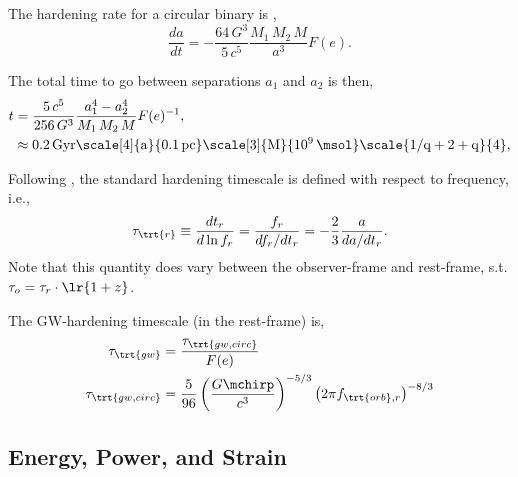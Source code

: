 \documentclass[10pt, oneside, onecolumn]{article}   	%
\newcommand{\frstorb}{f_{\trt{orb},r}}
\newcommand{\thard}{\tau_\trt{r}}
\newcommand{\tgw}{\tau_\trt{gw}}
\newcommand{\tgwc}{\tau_\trt{gw,circ}}
\begin{document}
            The hardening rate for a circular binary is \citep[][Eq.5.6]{Peters1964},
            \begin{equation}
                \label{eq:gw_hard}
                \frac{da}{dt} = -\frac{64 \, G^3}{5 \, c^5} \frac{M_1 \, M_2 \, M}{a^3} F(e).
            \end{equation}

            The total time to go between separations $a_1$ and $a_2$ is then,
            \begin{align}
                \label{eq:gw_coal_time}
                t & = \frac{5 \, c^5}{256 \, G^3} \frac{a_1^4 - a_2^4}{M_1 \, M_2 \, M} F(e)^{-1}, \\
                & \approx 0.2 \, \rm{Gyr} \scale[4]{a}{0.1 \, \rm{pc}} \scale[3]{M}{10^9 \, \msol} \scale{1/q + 2 + q}{4}, \\
            \end{align}

            Following \citep{enoki2007a}, the standard hardening timescale is defined with respect to frequency, i.e.,
            \begin{equation}
                \thard \equiv \frac{d t_r}{d\ln f_r} = \frac{f_r}{df_r/dt_r} = - \frac{2}{3} \frac{a}{da/dt_r}.
            \end{equation}
            Note that this quantity does vary between the observer-frame and rest-frame, s.t. $\tau_o = \tau_r \cdot \lr{1+z}$.

            The GW-hardening timescale (in the rest-frame) is,
            \begin{align}
                \label{eq:time_hard_gw}
                \tgw & = \frac{\tgwc}{F(e)} \\
                \tgwc & = \frac{5}{96}\left(\frac{G\mchirp}{c^3}\right)^{-5/3} \left(2 \pi \frstorb \right)^{-8/3}
            \end{align}

        \subsection{Energy, Power, and Strain}
\end{document}

